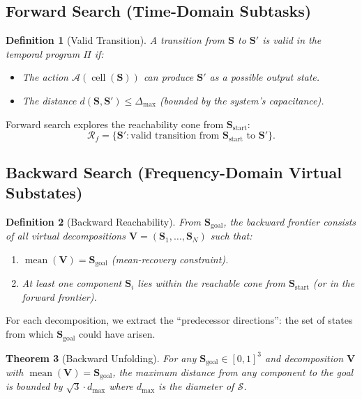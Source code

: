 \documentclass[twocolumn,11pt,a4paper]{article}
\newtheorem{theorem}{Theorem}[section]
\newtheorem{definition}[theorem]{Definition}
\newcommand{\Stuple}{\mathbf{S}}
\newcommand{\Reachable}{\mathcal{R}}
\newcommand{\calS}{\mathcal{S}}
\DeclareMathOperator{\cell}{cell}
\DeclareMathOperator{\mean}{mean}
\begin{document}
\subsection{Forward Search (Time-Domain Subtasks)}

\begin{definition}[Valid Transition]
A transition from $\Stuple$ to $\Stuple'$ is \emph{valid} in the temporal program $\Pi$ if:
\begin{itemize}[nosep,leftmargin=1em]
  \item The action $\mathcal{A}(\cell(\Stuple))$ can produce $\Stuple'$ as a possible output state.
  \item The distance $d(\Stuple, \Stuple') \leq \Delta_{\max}$ (bounded by the system's capacitance).
\end{itemize}
\end{definition}

Forward search explores the reachability cone from $\Stuple_{\text{start}}$:
\begin{equation}
  \Reachable_{f} = \{\Stuple' : \text{valid transition from } \Stuple_{\text{start}} \text{ to } \Stuple'\}.
\end{equation}

\subsection{Backward Search (Frequency-Domain Virtual Substates)}

\begin{definition}[Backward Reachability]
From $\Stuple_{\text{goal}}$, the backward frontier consists of all virtual decompositions $\mathbf{V} = (\Stuple_1, \ldots, \Stuple_N)$ such that:
\begin{enumerate}[nosep,label=(\roman*)]
  \item $\mean(\mathbf{V}) = \Stuple_{\text{goal}}$ (mean-recovery constraint).
  \item At least one component $\Stuple_i$ lies within the reachable cone from $\Stuple_{\text{start}}$ (or in the forward frontier).
\end{enumerate}
\end{definition}

For each decomposition, we extract the ``predecessor directions'': the set of states from which $\Stuple_{\text{goal}}$ could have arisen.

\begin{theorem}[Backward Unfolding]
For any $\Stuple_{\text{goal}} \in [0,1]^3$ and decomposition $\mathbf{V}$ with $\mean(\mathbf{V}) = \Stuple_{\text{goal}}$, the maximum distance from any component to the goal is bounded by $\sqrt{3} \cdot d_{\max}$ where $d_{\max}$ is the diameter of $\calS$.
\end{theorem}
\end{document}

